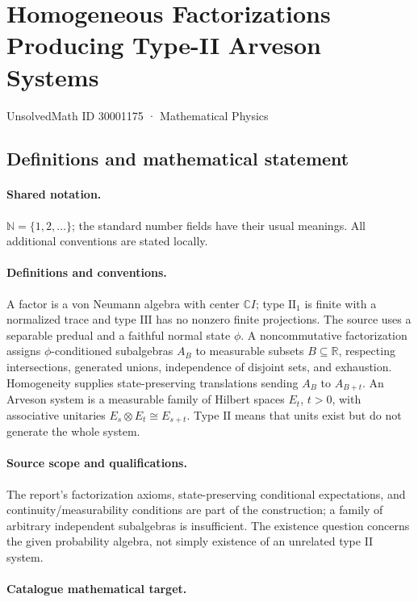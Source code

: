 \documentclass[11pt]{article}
\begin{document}
\setcounter{section}{30001174}
\section{Homogeneous Factorizations Producing Type-II Arveson Systems}\label{30001175}
{\small UnsolvedMath ID 30001175 · Mathematical Physics}
\subsection{Definitions and mathematical statement}

\paragraph{Shared notation.}$\mathbb N=\{1,2,\ldots\}$; the standard number fields have their usual meanings. All additional conventions are stated locally.


\paragraph{Definitions and conventions.} A factor is a von Neumann algebra with center $\mathbb C I$; type $\mathrm{II}_1$ is finite with a normalized trace and type $\mathrm{III}$ has no nonzero finite projections. The source uses a separable predual and a faithful normal state $\phi$. A noncommutative factorization assigns $\phi$-conditioned subalgebras $A_B$ to measurable subsets $B\subseteq\mathbb R$, respecting intersections, generated unions, independence of disjoint sets, and exhaustion. Homogeneity supplies state-preserving translations sending $A_B$ to $A_{B+t}$. An Arveson system is a measurable family of Hilbert spaces $E_t$, $t>0$, with associative unitaries $E_s\otimes E_t\cong E_{s+t}$. Type $\mathrm{II}$ means that units exist but do not generate the whole system.

\paragraph{Source scope and qualifications.} The report's factorization axioms, state-preserving conditional expectations, and continuity/measurability conditions are part of the construction; a family of arbitrary independent subalgebras is insufficient. The existence question concerns the given probability algebra, not simply existence of an unrelated type II system.

\paragraph{Catalogue mathematical target.}
\end{document}
